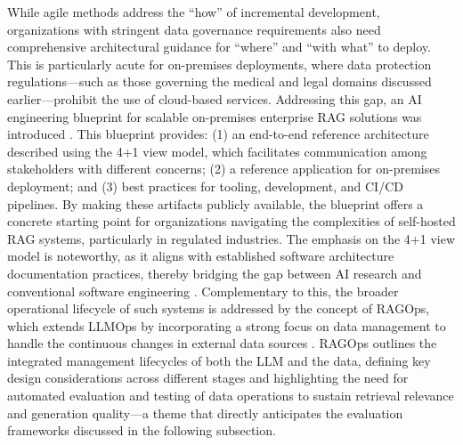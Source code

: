 \documentclass[11pt]{article}
\begin{document}
While agile methods address the ``how'' of incremental development, organizations with stringent data governance requirements also need comprehensive architectural guidance for ``where'' and ``with what'' to deploy. This is particularly acute for on-premises deployments, where data protection regulations---such as those governing the medical and legal domains discussed earlier---prohibit the use of cloud-based services. Addressing this gap, an AI engineering blueprint for scalable on-premises enterprise RAG solutions was introduced \cite{ref573}. This blueprint provides: (1) an end-to-end reference architecture described using the 4+1 view model, which facilitates communication among stakeholders with different concerns; (2) a reference application for on-premises deployment; and (3) best practices for tooling, development, and CI/CD pipelines. By making these artifacts publicly available, the blueprint offers a concrete starting point for organizations navigating the complexities of self-hosted RAG systems, particularly in regulated industries. The emphasis on the 4+1 view model is noteworthy, as it aligns with established software architecture documentation practices, thereby bridging the gap between AI research and conventional software engineering \cite{ref573}. Complementary to this, the broader operational lifecycle of such systems is addressed by the concept of RAGOps, which extends LLMOps by incorporating a strong focus on data management to handle the continuous changes in external data sources \cite{ref574}. RAGOps outlines the integrated management lifecycles of both the LLM and the data, defining key design considerations across different stages and highlighting the need for automated evaluation and testing of data operations to sustain retrieval relevance and generation quality---a theme that directly anticipates the evaluation frameworks discussed in the following subsection.
\end{document}
